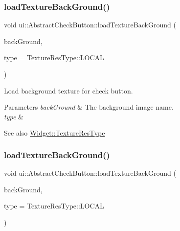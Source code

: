 \subsubsection{\texorpdfstring{load\+Texture\+Back\+Ground()}{loadTextureBackGround()}\hspace{0.1cm}{\footnotesize\ttfamily [1/2]}}
{\footnotesize\ttfamily void ui\+::\+Abstract\+Check\+Button\+::load\+Texture\+Back\+Ground (\begin{DoxyParamCaption}\item[{const std\+::string \&}]{back\+Ground,  }\item[{\hyperlink{classui_1_1Widget_a040a65ec5ad3b11119b7e16b98bd9af0}{Texture\+Res\+Type}}]{type = {\ttfamily TextureResType\+:\+:LOCAL} }\end{DoxyParamCaption})}

Load background texture for check button.


\begin{DoxyParams}{Parameters}
{\em back\+Ground} & The background image name. \\
\hline
{\em type} & \\
\hline
\end{DoxyParams}
\begin{DoxySeeAlso}{See also}
{\ttfamily \hyperlink{classui_1_1Widget_a040a65ec5ad3b11119b7e16b98bd9af0}{Widget\+::\+Texture\+Res\+Type}} 
\end{DoxySeeAlso}
\mbox{\label{classui_1_1AbstractCheckButton_a881269a03ef3da6feeb95a97369c1e37}} 
\subsubsection{\texorpdfstring{load\+Texture\+Back\+Ground()}{loadTextureBackGround()}\hspace{0.1cm}{\footnotesize\ttfamily [2/2]}}
{\footnotesize\ttfamily void ui\+::\+Abstract\+Check\+Button\+::load\+Texture\+Back\+Ground (\begin{DoxyParamCaption}\item[{const std\+::string \&}]{back\+Ground,  }\item[{\hyperlink{classui_1_1Widget_a040a65ec5ad3b11119b7e16b98bd9af0}{Texture\+Res\+Type}}]{type = {\ttfamily TextureResType\+:\+:LOCAL} }\end{DoxyParamCaption})}

